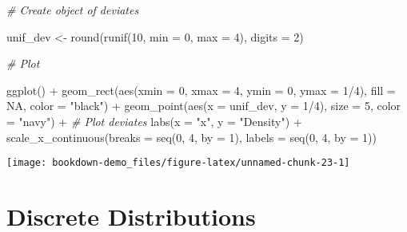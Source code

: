 \documentclass[
]{book}
\newenvironment{Shaded}{\begin{snugshade}}{\end{snugshade}}
\newcommand{\AttributeTok}[1]{\textcolor[rgb]{0.77,0.63,0.00}{#1}}
\newcommand{\CommentTok}[1]{\textcolor[rgb]{0.56,0.35,0.01}{\textit{#1}}}
\newcommand{\ConstantTok}[1]{\textcolor[rgb]{0.00,0.00,0.00}{#1}}
\newcommand{\DecValTok}[1]{\textcolor[rgb]{0.00,0.00,0.81}{#1}}
\newcommand{\FunctionTok}[1]{\textcolor[rgb]{0.00,0.00,0.00}{#1}}
\newcommand{\NormalTok}[1]{#1}
\newcommand{\OtherTok}[1]{\textcolor[rgb]{0.56,0.35,0.01}{#1}}
\newcommand{\SpecialCharTok}[1]{\textcolor[rgb]{0.00,0.00,0.00}{#1}}
\newcommand{\StringTok}[1]{\textcolor[rgb]{0.31,0.60,0.02}{#1}}
\begin{document}
\begin{Shaded}
\begin{Highlighting}[]
\CommentTok{\# Create object of deviates}

\NormalTok{unif\_dev }\OtherTok{\textless{}{-}} \FunctionTok{round}\NormalTok{(}\FunctionTok{runif}\NormalTok{(}\DecValTok{10}\NormalTok{, }\AttributeTok{min =} \DecValTok{0}\NormalTok{, }\AttributeTok{max =} \DecValTok{4}\NormalTok{), }\AttributeTok{digits =} \DecValTok{2}\NormalTok{)}

\CommentTok{\# Plot}

\FunctionTok{ggplot}\NormalTok{() }\SpecialCharTok{+}
  \FunctionTok{geom\_rect}\NormalTok{(}\FunctionTok{aes}\NormalTok{(}\AttributeTok{xmin =} \DecValTok{0}\NormalTok{, }\AttributeTok{xmax =} \DecValTok{4}\NormalTok{, }\AttributeTok{ymin =} \DecValTok{0}\NormalTok{, }\AttributeTok{ymax =} \DecValTok{1}\SpecialCharTok{/}\DecValTok{4}\NormalTok{), }
            \AttributeTok{fill =} \ConstantTok{NA}\NormalTok{,}
            \AttributeTok{color =} \StringTok{"black"}\NormalTok{) }\SpecialCharTok{+}
  \FunctionTok{geom\_point}\NormalTok{(}\FunctionTok{aes}\NormalTok{(}\AttributeTok{x =}\NormalTok{ unif\_dev, }\AttributeTok{y =} \DecValTok{1}\SpecialCharTok{/}\DecValTok{4}\NormalTok{), }\AttributeTok{size =} \DecValTok{5}\NormalTok{, }\AttributeTok{color =} \StringTok{"navy"}\NormalTok{) }\SpecialCharTok{+} \CommentTok{\# Plot deviates}
  \FunctionTok{labs}\NormalTok{(}\AttributeTok{x =} \StringTok{"x"}\NormalTok{, }\AttributeTok{y =} \StringTok{"Density"}\NormalTok{) }\SpecialCharTok{+}
  \FunctionTok{scale\_x\_continuous}\NormalTok{(}\AttributeTok{breaks =} \FunctionTok{seq}\NormalTok{(}\DecValTok{0}\NormalTok{, }\DecValTok{4}\NormalTok{, }\AttributeTok{by =} \DecValTok{1}\NormalTok{), }\AttributeTok{labels =} \FunctionTok{seq}\NormalTok{(}\DecValTok{0}\NormalTok{, }\DecValTok{4}\NormalTok{, }\AttributeTok{by =} \DecValTok{1}\NormalTok{))}
\end{Highlighting}
\end{Shaded}

\begin{center}\texttt{[image: bookdown-demo\_files/figure-latex/unnamed-chunk-23-1]} \end{center}

\hypertarget{Discrete}{%
\chapter{Discrete Distributions}\label{Discrete}}
\end{document}
